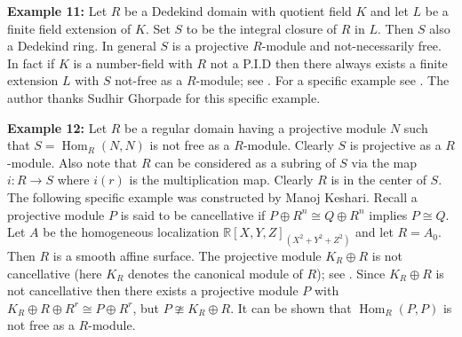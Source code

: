 \documentclass{amsart}
\theoremstyle{plain}
\theoremstyle{definition}
\theoremstyle{remark}
\numberwithin{equation}{theorem}
\begin{document}
\textbf{Example 11:} Let $R$ be a Dedekind  domain with quotient field $K$ and let $L$ be a finite field extension of $K$. Set $S$ to be the integral closure of $R$ in $L$. Then $S$ also a Dedekind ring. In general $S$ is a projective $R$-module and not-necessarily free. In fact if $K$ is a number-field with $R$ not a P.I.D then there always exists a finite extension $L$ with $S$ not-free as a $R$-module; see \cite{Mann}. For a specific example see \cite{MS}. The author thanks Sudhir Ghorpade for this specific example.

\textbf{Example 12:} Let $R$ be a regular domain having a projective module $N$ such that $S = {\operatorname{Hom}}_R(N,N)$ is not free
as a $R$-module. Clearly $S$ is projective as a $R$-module. Also note  that $R$ can be considered as a subring of $S$ via the map $i \colon R {\rightarrow} S$ where $i(r)$ is the multiplication map. Clearly $R$ is in the center of $S$.
The following specific example was constructed by Manoj Keshari. Recall a projective module $P$ is said to be cancellative if $P\oplus R^n \cong Q\oplus R^n$ implies $P \cong Q$. Let $A $ be the homogeneous localization
$\mathbb{R}[X,Y,Z]_{(X^2 + Y^2 + Z^2)}$ and let $R = A_0$. Then $R$ is a smooth affine surface. The projective module
$K_R \oplus R$ is not cancellative (here $K_R$ denotes the canonical module of $R$); see \cite[Example 3.1]{Bhat}. Since
$K_R \oplus R$ is not cancellative then there exists a projective module $P$ with $K_R \oplus R \oplus R^r  \cong
P \oplus R^r$, but $ P \ncong K_R \oplus R$. It can be shown that ${\operatorname{Hom}}_R(P,P)$ is not free as a $R$-module.
\end{document}
